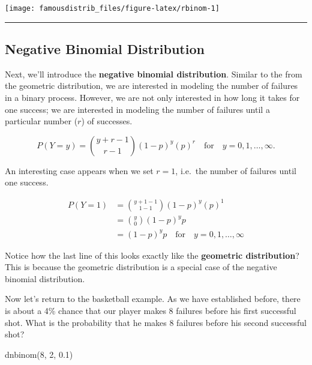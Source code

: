 \documentclass[
]{article}
\newenvironment{Shaded}{\begin{snugshade}}{\end{snugshade}}
\newcommand{\DecValTok}[1]{\textcolor[rgb]{0.00,0.00,0.81}{#1}}
\newcommand{\FloatTok}[1]{\textcolor[rgb]{0.00,0.00,0.81}{#1}}
\newcommand{\FunctionTok}[1]{\textcolor[rgb]{0.00,0.00,0.00}{#1}}
\newcommand{\NormalTok}[1]{#1}
\begin{document}
\begin{center}\texttt{[image: famousdistrib\_files/figure-latex/rbinom-1]} \end{center}

\begin{center}\rule{0.5\linewidth}{0.5pt}\end{center}

\hypertarget{negative-binomial-distribution}{%
\subsection{Negative Binomial Distribution}\label{negative-binomial-distribution}}

Next, we'll introduce the \textbf{negative binomial distribution}. Similar to the from the geometric distribution, we are interested in modeling the number of failures in a binary process. However, we are not only interested in how long it takes for one success; we are interested in modeling the number of failures until a particular number (\(r\)) of successes.

\[\begin{equation}
P(Y=y) = \binom{y + r - 1}{r-1} (1-p)^{y}(p)^r \quad \textrm{for}\quad y = 0, 1, \ldots, \infty.
\end{equation}\]

An interesting case appears when we set \(r=1\), i.e.~the number of failures until one success.

\[\begin{split}
P(Y=1) &= \binom{y + 1 - 1}{1-1} (1-p)^{y} (p)^1 \\ &= \binom{y}{0} (1-p)^yp \\ &=(1-p)^yp \quad \textrm{for} \quad y = 0, 1, \ldots, \infty
\end{split}\]

Notice how the last line of this looks exactly like the \textbf{geometric distribution}? This is because the geometric distribution is a special case of the negative binomial distribution.

Now let's return to the basketball example. As we have established before, there is about a 4\% chance that our player makes 8 failures before his first successful shot. What is the probability that he makes 8 failures before his second successful shot?

\begin{Shaded}
\begin{Highlighting}[]
\FunctionTok{dnbinom}\NormalTok{(}\DecValTok{8}\NormalTok{, }\DecValTok{2}\NormalTok{, }\FloatTok{0.1}\NormalTok{)}
\end{Highlighting}
\end{Shaded}
\end{document}
